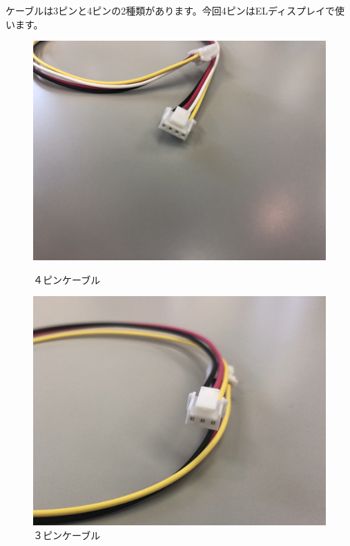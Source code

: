 ケーブルは3ピンと4ピンの2種類があります。今回4ピンはELディスプレイで使います。\\
\begin{figure}[H]
  \begin{minipage}[t]{0.48\columnwidth}
    \centering
    \includegraphics[width=0.8\hsize]{images/chap05/text05-img014.jpg}
    \caption{４ピンケーブル}
  \end{minipage}
  \hspace{0.04\columnwidth} %
  \begin{minipage}[t]{0.48\columnwidth}
    \centering
    \includegraphics[width=0.8\hsize]{images/chap05/text05-img015.jpg}
    \caption{３ピンケーブル}
  \end{minipage}
\end{figure}











